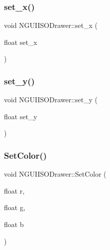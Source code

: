 \hypertarget{class_n_g_u_i_i_s_o_drawer_ad3a5ea284784f4f614e9474eeae953e2}{}\label{class_n_g_u_i_i_s_o_drawer_ad3a5ea284784f4f614e9474eeae953e2} 
\subsubsection{\texorpdfstring{set\+\_\+x()}{set\_x()}}
{\footnotesize\ttfamily void N\+G\+U\+I\+I\+S\+O\+Drawer\+::set\+\_\+x (\begin{DoxyParamCaption}\item[{float}]{set\+\_\+x }\end{DoxyParamCaption})}

\hypertarget{class_n_g_u_i_i_s_o_drawer_a9c909f169cd3c8bc1a1c903483b3bb06}{}\label{class_n_g_u_i_i_s_o_drawer_a9c909f169cd3c8bc1a1c903483b3bb06} 
\subsubsection{\texorpdfstring{set\+\_\+y()}{set\_y()}}
{\footnotesize\ttfamily void N\+G\+U\+I\+I\+S\+O\+Drawer\+::set\+\_\+y (\begin{DoxyParamCaption}\item[{float}]{set\+\_\+y }\end{DoxyParamCaption})}

\hypertarget{class_n_g_u_i_i_s_o_drawer_a8dd1326af9335158267ed3ddadc900d3}{}\label{class_n_g_u_i_i_s_o_drawer_a8dd1326af9335158267ed3ddadc900d3} 
\subsubsection{\texorpdfstring{Set\+Color()}{SetColor()}\hspace{0.1cm}{\footnotesize\ttfamily [1/2]}}
{\footnotesize\ttfamily void N\+G\+U\+I\+I\+S\+O\+Drawer\+::\+Set\+Color (\begin{DoxyParamCaption}\item[{float}]{r,  }\item[{float}]{g,  }\item[{float}]{b }\end{DoxyParamCaption})}

